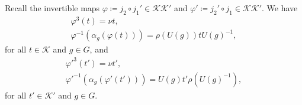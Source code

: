 \noindent\begin{lemma}\label{OneClickRotation} Recall the invertible maps $\varphi \coloneqq j_2 \circ j_1' \in \mathcal{K}\mathcal{K}'$ and $\varphi' \coloneqq j_2' \circ j_1 \in \mathcal{K}\mathcal{K}'$. We have
\begin{gather}
\varphi^3(t) = \nu t,\\
\varphi^{-1}(\alpha_g(\varphi(t))) = \rho(U(g)) t U(g)^{-1},
\end{gather}
\noindent for all $t \in \mathcal{K}$ and $g \in G$, and
\begin{gather}
\varphi'^3(t') = \nu t',\\
\varphi'^{-1}(\alpha_g(\varphi'(t'))) = U(g) t'\rho(U(g)^{-1}),
\end{gather}
\noindent for all $t' \in \mathcal{K}'$ and $g \in G$.\\
\end{lemma}

